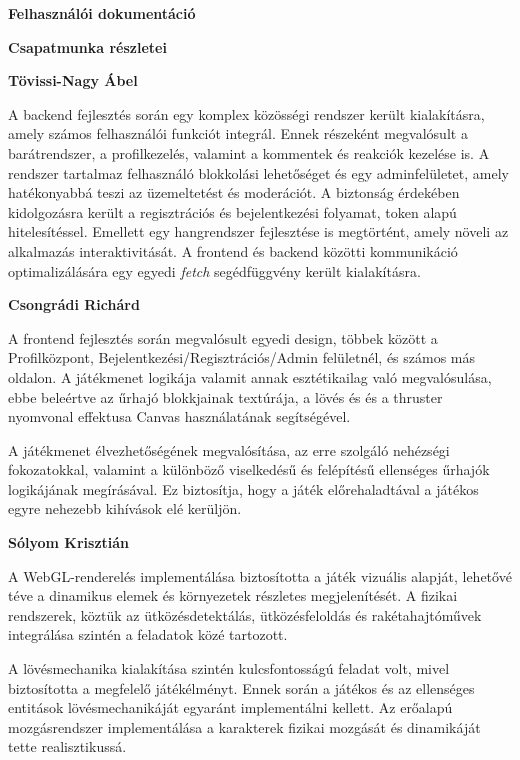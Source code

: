 \documentclass[12pt]{report}
\newcommand{\fullpagetitle}[1]{%
    \clearpage
    \thispagestyle{empty}
    \vspace*{\fill}
    \begin{center}
        {\Huge\bfseries #1\par}
    \end{center}
    \vspace*{\fill}
    \clearpage
    \setcounter{section}{0}
}
\begin{document}
\fullpagetitle{Felhasználói dokumentáció}

\fullpagetitle{Csapatmunka részletei}

\newpage
\markboth{}{}

\noindent\textbf{Tövissi-Nagy Ábel}

A backend fejlesztés során egy komplex közösségi rendszer került kialakításra, amely számos felhasználói funkciót integrál. Ennek részeként megvalósult a barátrendszer, a profilkezelés, valamint a kommentek és reakciók kezelése is. A rendszer tartalmaz felhasználó blokkolási lehetőséget és egy adminfelületet, amely hatékonyabbá teszi az üzemeltetést és moderációt. A biztonság érdekében kidolgozásra került a regisztrációs és bejelentkezési folyamat, token alapú hitelesítéssel. Emellett egy hangrendszer fejlesztése is megtörtént, amely növeli az alkalmazás interaktivitását. A frontend és backend közötti kommunikáció optimalizálására egy egyedi \textit{fetch} segédfüggvény került kialakításra.

\vspace{3mm}
\noindent\textbf{Csongrádi Richárd}

A frontend fejlesztés során megvalósult egyedi design, többek között a Profilközpont, Bejelentkezési/Regisztrációs/Admin felületnél, és számos más oldalon.
A játékmenet logikája valamit annak esztétikailag való megvalósulása, ebbe beleértve az űrhajó blokkjainak textúrája, a lövés és és a thruster nyomvonal effektusa Canvas használatának segítségével.

A játékmenet élvezhetőségének megvalósítása, az erre szolgáló nehézségi fokozatokkal, valamint a különböző viselkedésű és felépítésű ellenséges űrhajók logikájának megírásával. Ez biztosítja, hogy a játék előrehaladtával a játékos egyre nehezebb kihívások elé kerüljön.

\vspace{3mm}
\noindent\textbf{Sólyom Krisztián}

A WebGL-renderelés implementálása biztosította a játék vizuális alapját, lehetővé téve a dinamikus elemek és környezetek részletes megjelenítését. A fizikai rendszerek, köztük az ütközésdetektálás, ütközésfeloldás és rakétahajtóművek integrálása szintén a feladatok közé tartozott.

A lövésmechanika kialakítása szintén kulcsfontosságú feladat volt, mivel biztosította a megfelelő játékélményt. Ennek során a játékos és az ellenséges entitások lövésmechanikáját egyaránt implementálni kellett. Az erőalapú mozgásrendszer implementálása a karakterek fizikai mozgását és dinamikáját tette realisztikussá.
\end{document}
